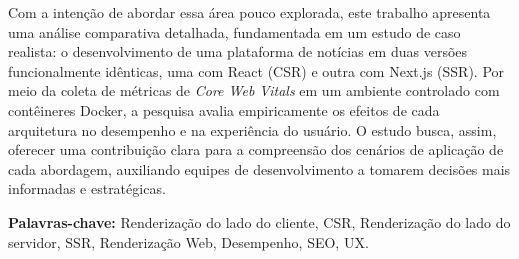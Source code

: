 \begin{resumo}
Com a intenção de abordar essa área pouco explorada, este trabalho apresenta uma análise comparativa detalhada, fundamentada em um estudo de caso realista: o desenvolvimento de uma plataforma de notícias em duas versões funcionalmente idênticas, uma com React (CSR) e outra com Next.js (SSR). Por meio da coleta de métricas de \textit{Core Web Vitals} em um ambiente controlado com contêineres Docker, a pesquisa avalia empiricamente os efeitos de cada arquitetura no desempenho e na experiência do usuário. O estudo busca, assim, oferecer uma contribuição clara para a compreensão dos cenários de aplicação de cada abordagem, auxiliando equipes de desenvolvimento a tomarem decisões mais informadas e estratégicas.

\textbf{Palavras-chave:} Renderização do lado do cliente, CSR, Renderização do lado do servidor, SSR, Renderização Web, Desempenho, SEO, UX.
\end{resumo}
